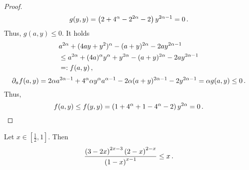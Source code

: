 \begin{proof}
\begin{equation*}
		g(y,y) = \left( 2 + 4^\alpha - 2^{2\alpha} - 2 \right) y^{2\alpha-1} = 0
		\, .
	\end{equation*}
	Thus,  $g(a,y) \leq 0$. It holds
	\begin{align*}
		&a^{2\alpha} + (4 a y + y^2)^\alpha - (a+y)^{2\alpha} - 2 a y^{2\alpha-1}
		\\&\leq 
		a^{2\alpha} + (4 a)^\alpha y^\alpha +y^{2\alpha} - (a+y)^{2\alpha} - 2 a y^{2\alpha-1}
		\\&=:f(a,y)
		\, ,
	\end{align*}
	\begin{equation*}
		\partial_a f(a,y) = 2\alpha a^{2\alpha-1} + 4^\alpha \alpha y^\alpha a^{\alpha-1} - 2\alpha(a+y)^{2\alpha-1} - 2y^{2\alpha-1}
		= \alpha g(a,y) \leq 0
		\, .
	\end{equation*}
	Thus,
	\begin{equation*}
		f(a,y) \leq f(y,y) = \left( 1+4^\alpha+1-4^\alpha-2 \right) y^{2\alpha} = 0
		\, .
	\end{equation*}
\end{proof}
%
\begin{lemma}\label{lmm:alphaFraction}
	Let $x\in[\frac12,1 ]$. Then
	\begin{equation*}
		\frac{\left( 3-2x \right)^{2x-3} \left( 2-x \right)^{2-x}}{\left( 1-x \right)^{x-1}} \leq x
		\, .
	\end{equation*}
\end{lemma}
%
